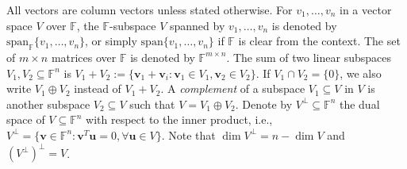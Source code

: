 \documentclass[11pt]{article}
\newif\ifmynotes
\newcommand{\ZGnote}[1]{\ifmynotes\textcolor{purple}{[Zeyu: #1]}\else\fi}
\theoremstyle{plain}
\theoremstyle{definition}
\theoremstyle{remark}
\newcommand{\F}{\mathbb{F}}
\newcommand{\spa}{\mathrm{span}}
\newcommand{\bv}{\bm{v}}
\newcommand{\bu}{\bm{u}}
\begin{document}
All vectors are column vectors unless stated otherwise.
For $v_1,\ldots,v_n$ in a vector space $V$ over $\F$, the $\F$-subspace $V$ spanned by $v_1,\ldots,v_n$ is denoted by $\spa_{\F}\{v_1,\ldots,v_n\}$, or simply $\spa\{v_1,\ldots,v_n\}$ if $\F$ is clear from the context. The set of $m\times n$ matrices over $\F$ is denoted by $\F^{m\times n}$. The sum of two linear subspaces $V_1,V_2\subseteq\F^n$ is $V_1+V_2:=\{\bv_1+\bv_i:\bv_1\in V_1,\bv_2\in V_2\}$. If $V_1\cap V_2=\{0\}$, we also write $V_1\oplus V_2$ instead of $V_1+V_2$. 
A \emph{complement} of a subspace $V_1\subseteq V$ in $V$ is another subspace $V_2\subseteq V$ such that $V=V_1\oplus V_2$. 
Denote by $V^\perp\subseteq\F^n$ the dual space of $V\subseteq\F^n$ with respect to the inner product, i.e., $V^\perp=\{\bv\in\F^n: \bv^T\bu=0, \forall \bu\in V\}$.
Note that $\dim V^\perp=n-\dim V$ and $(V^\perp)^\perp=V$. 
\end{document}
